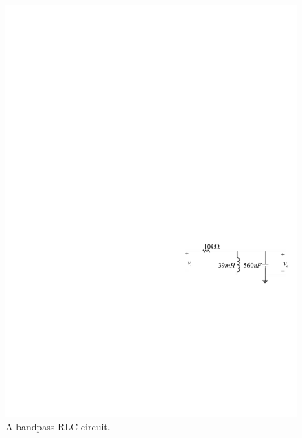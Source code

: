 \documentclass[11pt]{article}
\begin{document}

\begin{question}


    \begin{figure}[H]
        \centering
        \includegraphics[scale=1.2,angle=0]{Fig/cir4.pdf}
        \caption{A bandpass RLC circuit.} \label{fig:cir4}
    \end{figure}


\end{question}
\end{document}
